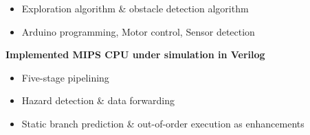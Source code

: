 \documentclass[a4paper, 12pt]{article}
\newenvironment{changemargin}[2]{%
  \begin{list}{}{%
      \setlength{\topsep}{0pt}%
      \setlength{\leftmargin}{#1}%
      \setlength{\rightmargin}{#2}%
      \setlength{\listparindent}{\parindent}%
      \setlength{\itemindent}{\parindent}%
      \setlength{\parsep}{\parskip}%
    }%
  \item[]}{\end{list}
}
\newcommand{\lineover}{
  \begin{changemargin}{-0.05in}{-0.05in}
    \vspace*{-8pt}
    \hrulefill \\
    \vspace*{-2pt}
  \end{changemargin}
}
\newcommand{\header}[1]{
  \begin{changemargin}{-0.6in}{-0.6in}
    \fontsize{15}{15}\scshape{#1}\\
    \lineover
    \vspace*{-4pt}
  \end{changemargin}
}
\newenvironment{body}
{
\vspace*{-16pt}
\begin{changemargin}{-0.25in}{-0.5in}
}
{
\end{changemargin}
}
\begin{document}
\begin{body}
\begin{itemize}
        \item Exploration algorithm \& obstacle detection algorithm
        \item Arduino programming, Motor control, Sensor detection
    \end{itemize}
  \textbf{Implemented MIPS CPU under simulation in Verilog}\\
  \vspace*{-6pt}
    \begin{itemize} \itemsep -0pt \small
        \item Five-stage pipelining
        \item Hazard detection \& data forwarding
        \item Static branch prediction \& out-of-order execution as enhancements
    \end{itemize}



\end{body}

%
\end{document}
